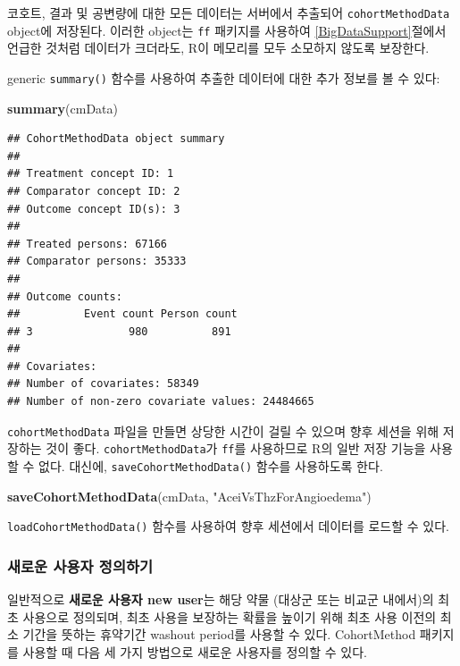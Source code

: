 \documentclass[10.5pt]{book}
\newenvironment{Shaded}{\begin{snugshade}}{\end{snugshade}}
\newcommand{\KeywordTok}[1]{\textcolor[rgb]{0.13,0.29,0.53}{\textbf{#1}}}
\newcommand{\StringTok}[1]{\textcolor[rgb]{0.31,0.60,0.02}{#1}}
\newcommand{\NormalTok}[1]{#1}
\theoremstyle{definition}
\theoremstyle{definition}
\theoremstyle{definition}
\theoremstyle{remark}
\begin{document}
코호트, 결과 및 공변량에 대한 모든 데이터는 서버에서 추출되어
\texttt{cohortMethodData} object에 저장된다. 이러한 object는 \texttt{ff}
패키지를 사용하여 \ref{BigDataSupport}절에서 언급한 것처럼 데이터가
크더라도, R이 메모리를 모두 소모하지 않도록 보장한다.

generic \texttt{summary()} 함수를 사용하여 추출한 데이터에 대한 추가
정보를 볼 수 있다:

\begin{Shaded}
\begin{Highlighting}[]
\KeywordTok{summary}\NormalTok{(cmData)}
\end{Highlighting}
\end{Shaded}

\begin{verbatim}
## CohortMethodData object summary
## 
## Treatment concept ID: 1
## Comparator concept ID: 2
## Outcome concept ID(s): 3
## 
## Treated persons: 67166
## Comparator persons: 35333
## 
## Outcome counts:
##          Event count Person count
## 3               980          891
## 
## Covariates:
## Number of covariates: 58349
## Number of non-zero covariate values: 24484665
\end{verbatim}

\texttt{cohortMethodData} 파일을 만들면 상당한 시간이 걸릴 수 있으며
향후 세션을 위해 저장하는 것이 좋다. \texttt{cohortMethodData}가
\texttt{ff}를 사용하므로 R의 일반 저장 기능을 사용할 수 없다. 대신에,
\texttt{saveCohortMethodData()} 함수를 사용하도록 한다.

\begin{Shaded}
\begin{Highlighting}[]
\KeywordTok{saveCohortMethodData}\NormalTok{(cmData, }\StringTok{"AceiVsThzForAngioedema"}\NormalTok{)}
\end{Highlighting}
\end{Shaded}

\texttt{loadCohortMethodData()} 함수를 사용하여 향후 세션에서 데이터를
로드할 수 있다.

\subsubsection*{새로운 사용자 정의하기}\label{--}

일반적으로 \textbf{새로운 사용자 new user}는 해당 약물 (대상군 또는
비교군 내에서)의 최초 사용으로 정의되며, 최초 사용을 보장하는 확률을
높이기 위해 최초 사용 이전의 최소 기간을 뜻하는 휴약기간 washout
period를 사용할 수 있다. CohortMethod 패키지를 사용할 때 다음 세 가지
방법으로 새로운 사용자를 정의할 수 있다.
\end{document}
